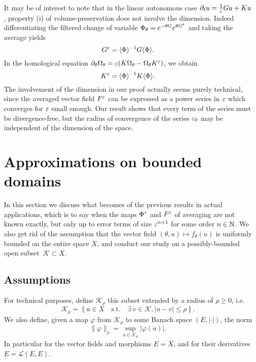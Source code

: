 \begin{remark}
  It may be of interest to note that in the linear autonomous case $\partial_t
  u = \frac{1}{\varepsilon} Gu + Ku$, property (i) of volume-preservation does
  not involve the dimension. Indeed differentiating the filtered change of
  variable $\Phi_\theta = e^{-\theta G} e^{\theta G^{\varepsilon}}$ and taking
  the average yields 
  \begin{equation*}
    G^{\varepsilon} = \langle \Phi \rangle^{-1} G \langle \Phi \rangle .
  \end{equation*}
  In the homological equation $\partial_\theta \Omega_\theta = \varepsilon (
  K \Omega_\theta - \Omega_\theta K^{\varepsilon} )$, we obtain 
  \begin{equation*}
    K^{\varepsilon} = \langle \Phi \rangle^{-1} K \langle \Phi \rangle .
  \end{equation*}
  The involvement of the dimension in our proof actually
  seems purely technical, since the averaged vector field $F^{\varepsilon}$ can be
  expressed as a power series in $\varepsilon$ which converges for $\varepsilon$ small
  enough. Our result shows that every term of the series must be
  divergence-free, but the radius of convergence of the series $\varepsilon_0$ may
  be independent of the dimension of the space.
\end{remark}




\section{Approximations on bounded domains}
\label{sec:approx}

In this section we discuss what becomes of the previous results in actual
applications, which is to say when the maps $\Phi^{\varepsilon}$ and $F^{\varepsilon}$ of
averaging are not known exactly, but only up to error terms of size
$\varepsilon^{n+1}$ for some order $n \in \mathbb{N}$. We also get rid of the assumption
that the vector field $(\theta , u) \mapsto f_\theta(u)$ is uniformly
bounded on the entire space $X$, and conduct our study on a
possibly-bounded open subset~$\mathcal{K} \subset X$. 

\subsection{Assumptions}

For technical purposes, define $\mathcal{K}_\rho$ this subset extended by
a radius of $\rho \geq 0$, i.e.
\begin{equation*}
  \mathcal{K}_\rho = \left\{u \in X \quad \text{s.t.}\quad 
                      \exists\ v \in \mathcal{K}, |u - v| \leq \rho 
                  \right\} .
\end{equation*}
We also define, given a map $\varphi$ from $\mathcal{K}_\rho$ to some
Banach space $(E, |\cdot|)$, the norm 
\begin{equation*}
  \| \varphi \|_\rho = \sup_{u \in \mathcal{K}_\rho} |\varphi(u) |.
\end{equation*}
In particular for the vector fields and morphisms $E = X$, and for their
derivatives $E = \mathcal{L}(E,E)$. 


